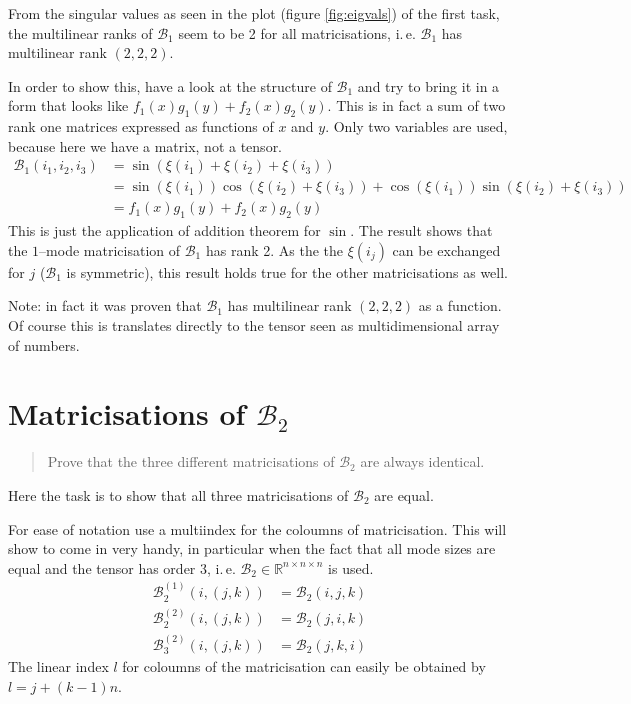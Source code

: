 \documentclass[%
a4paper,
parskip=half,
DIV=calc,
]
{scrartcl}
\begin{document}
From the singular values as seen in
the plot (figure \ref{fig:eigvals}) of the first task, the multilinear ranks of $\mathcal{B}_1$
seem to be 2 for all matricisations, i.\,e. $\mathcal{B}_1$ has
multilinear rank $(2, 2, 2)$.

In order to show this, have a look at the structure of $\mathcal{B}_1$
and try to bring it in a form that looks like
$f_1(x)g_1(y) + f_2(x)g_2(y)$.  This is in fact a sum of two rank one
matrices expressed as functions of $x$ and $y$.  Only two variables
are used, because here we have a matrix, not a tensor.
\begin{align*}
  \mathcal{B}_1 \left(i_1, i_2, i_3 \right) &= \sin\left(\xi(i_1) + \xi(i_2) + \xi(i_3)\right) \\
                                           &= \sin\left(\xi(i_1)\right)\cos\left(\xi(i_2) + \xi(i_3)\right) +
                                               \cos\left(\xi(i_1)\right)\sin\left(\xi(i_2) + \xi(i_3)\right)\\
  &= f_1(x)g_1(y) + f_2(x)g_2(y)
\end{align*}
This is just the application of addition theorem for $\sin$.  The
result shows that the $1$--mode matricisation of $\mathcal{B}_1$ has
rank 2.  As the the $\xi(i_j)$ can be exchanged for $j$ ($\mathcal{B}_1$ is
symmetric), this result holds true for the other matricisations as
well.

Note: in fact it was proven that $\mathcal{B}_1$ has multilinear rank
$(2,2,2)$ as a function. Of course this is translates directly to the
tensor seen as multidimensional array of numbers.

\section{Matricisations of $\mathcal{B}_2$}
\label{sec:matb2}
\begin{quotation}
  \noindent
  Prove that the three different matricisations of $\mathcal{B}_2$ are
  always identical.
\end{quotation}
Here the task is to show that all three matricisations of
$\mathcal{B}_2$ are equal.

For ease of notation use a multiindex for the coloumns of
matricisation. This will show to come in very handy, in particular
when the fact that all mode sizes are equal and the tensor has order
3, i.\,e.  $\mathcal{B}_2 \in \mathbb{R}^{n \times n \times n}$ is
used.
\begin{align*}
  \mathcal{B}_2^{(1)}(i, (j, k)) &= \mathcal{B}_2 (i, j, k) \\
  \mathcal{B}_2^{(2)}(i, (j, k)) &= \mathcal{B}_2 (j, i, k) \\
  \mathcal{B}_3^{(2)}(i, (j, k)) &= \mathcal{B}_2 (j, k, i)
\end{align*}
The linear index $l$ for coloumns of the matricisation can easily be obtained by $l = j +(k-1)n$.
\end{document}
